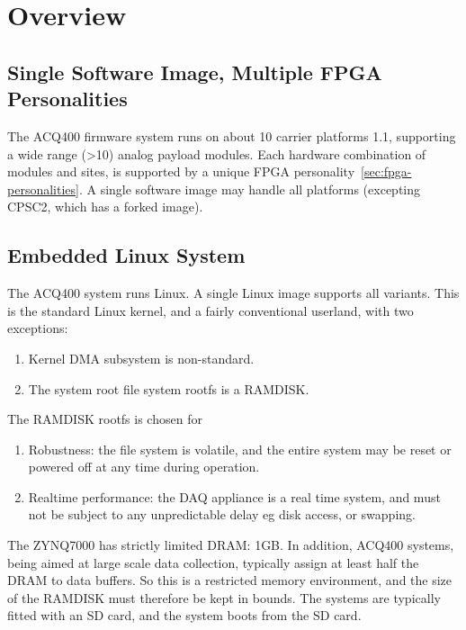 \documentclass[]{article}
\begin{document}
\section{Overview}

\subsection{Single Software Image, Multiple FPGA Personalities}
The ACQ400 firmware system runs on about 10 carrier platforms 1.1, supporting a wide range (>10) analog payload modules.  Each hardware combination of modules and sites, is supported by a unique FPGA personality~\ref{sec:fpga-personalities}. A single software image may handle all platforms (excepting CPSC2, which has a forked image).

\subsection{Embedded Linux System}
The ACQ400 system runs Linux. A single Linux image supports all variants. This is the standard Linux kernel, and a fairly conventional userland, with two exceptions:
\begin{enumerate}
    \item Kernel DMA subsystem is non-standard.
    \item The system root file system rootfs is a RAMDISK. 
\end{enumerate} 

The RAMDISK rootfs is chosen for 
\begin{enumerate}
    \item Robustness: the file system is volatile, and the entire system may be reset or powered off at any time during operation. 
    \item Realtime performance: the DAQ appliance is a real time system, and must not be subject to any unpredictable delay eg disk access, or swapping.
\end{enumerate} 
The ZYNQ7000 has strictly limited DRAM: 1GB. In addition, ACQ400 systems, being aimed at large scale data collection, typically assign at least half the DRAM to data buffers. So this is a restricted memory environment, and the size of the RAMDISK must therefore be kept in bounds.
The systems are typically fitted with an SD card, and the system boots from the SD card.
\end{document}
